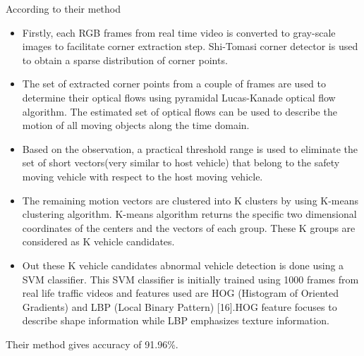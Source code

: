 According to their method 
\begin{itemize}
    \item Firstly, each RGB frames from real time video is converted to gray-scale images to facilitate corner extraction step. Shi-Tomasi corner detector is used to obtain a sparse distribution of corner points.
    
    \item The set of extracted corner points from a couple of frames are used to determine their optical flows using pyramidal Lucas-Kanade optical flow algorithm. The estimated set of optical flows can be used to describe the motion of all moving objects along the time domain.
    
    \item Based on the observation, a practical threshold range is used to eliminate the set of short vectors(very similar to host vehicle) that belong to the safety moving vehicle with respect to the host moving vehicle.
    
    \item The remaining motion vectors are clustered into K clusters by using K-means clustering algorithm. K-means algorithm returns the specific two dimensional coordinates of the centers and the vectors of each group. These K groups are considered as K vehicle candidates.
    
    \item Out these K vehicle candidates abnormal vehicle detection is done using a SVM classifier. This SVM classifier is initially trained using 1000 frames from real life traffic videos and features used are HOG (Histogram of Oriented Gradients) and LBP (Local Binary Pattern) [16].HOG feature focuses to describe shape information while LBP emphasizes texture information.
\end{itemize}

Their method gives accuracy of 91.96\%.